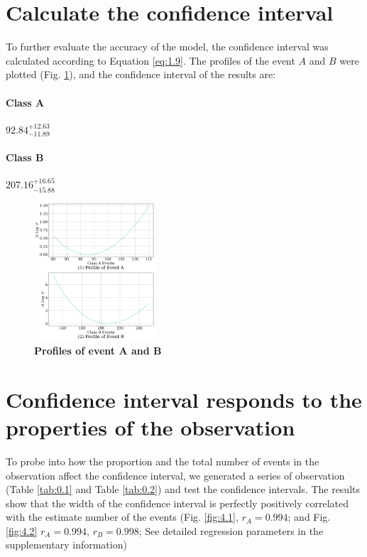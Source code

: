\documentclass[10pt,a4paper,twocolumn,twoside,UTF8]{article}
\begin{document}
	\section{Calculate the confidence interval}
	To further evaluate the accuracy of the model, the confidence interval was calculated according to Equation \ref{eq:1.9}. 
	The profiles of the event $A$ and $B$ were plotted (Fig. \ref{fig:3.1}), and the confidence interval of the results are: 
	\paragraph{Class A} $92.84^{+12.63}_{-11.89}$
	\paragraph{Class B} $207.16^{+16.65}_{-15.88}$
	\begin{figure}[htbp]
		\centering
		\includegraphics[width=0.4\textwidth]{attachments/fig.3.1.png}
		\caption{\textbf{Profiles of event A and B}}
		\label{fig:3.1}
	\end{figure}

	\section{Confidence interval responds to the properties of the observation}
	To probe into how the proportion and the total number of events in the observation affect the confidence interval, 
	we generated a series of observation (Table \ref{tab:0.1} and Table \ref{tab:0.2}) and test the confidence intervals. 
	The results show that the width of the confidence interval is perfectly positively correlated with the estimate number of the events 
	(Fig. \ref{fig:4.1}, $r_A=0.994$; and Fig. \ref{fig:4.2} $r_A=0.994$, $r_B=0.998$; See detailed regression parameters in the supplementary information)
\end{document}
